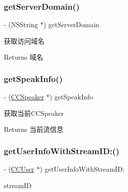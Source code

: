 \subsubsection{\texorpdfstring{get\+Server\+Domain()}{getServerDomain()}}
{\footnotesize\ttfamily -\/ (N\+S\+String $\ast$) get\+Server\+Domain \begin{DoxyParamCaption}{ }\end{DoxyParamCaption}}

获取访问域名 \begin{DoxyReturn}{Returns}
域名 
\end{DoxyReturn}
\mbox{\label{interface_c_c_streamer_basic_a93ffb49f4b1a3cbbbeb89ec1927f60b7}} 
\subsubsection{\texorpdfstring{get\+Speak\+Info()}{getSpeakInfo()}}
{\footnotesize\ttfamily -\/ (\hyperlink{interface_c_c_speaker}{C\+C\+Speaker} $\ast$) get\+Speak\+Info \begin{DoxyParamCaption}{ }\end{DoxyParamCaption}}

获取当前\+C\+C\+Speaker \begin{DoxyReturn}{Returns}
当前流信息 
\end{DoxyReturn}
\mbox{\label{interface_c_c_streamer_basic_ad0c98fb251203fb7531ecdabbe3ae84f}} 
\subsubsection{\texorpdfstring{get\+User\+Info\+With\+Stream\+I\+D\+:()}{getUserInfoWithStreamID:()}}
{\footnotesize\ttfamily -\/ (\hyperlink{interface_c_c_user}{C\+C\+User} $\ast$) get\+User\+Info\+With\+Stream\+I\+D\+: \begin{DoxyParamCaption}\item[{(N\+S\+String $\ast$)}]{stream\+ID }\end{DoxyParamCaption}}

